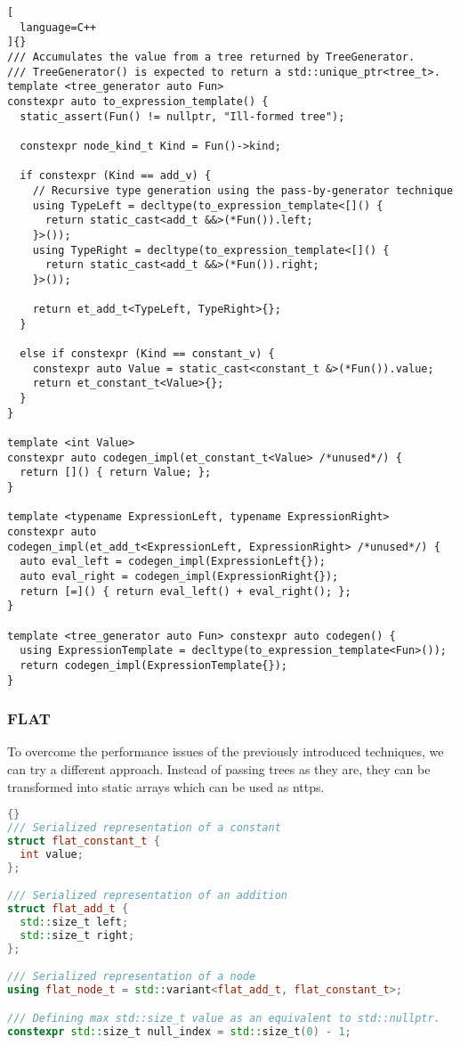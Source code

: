 \documentclass[../main]{subfiles}
\begin{document}
\begin{lstlisting}[
  language=C++
]{}
/// Accumulates the value from a tree returned by TreeGenerator.
/// TreeGenerator() is expected to return a std::unique_ptr<tree_t>.
template <tree_generator auto Fun>
constexpr auto to_expression_template() {
  static_assert(Fun() != nullptr, "Ill-formed tree");

  constexpr node_kind_t Kind = Fun()->kind;

  if constexpr (Kind == add_v) {
    // Recursive type generation using the pass-by-generator technique
    using TypeLeft = decltype(to_expression_template<[]() {
      return static_cast<add_t &&>(*Fun()).left;
    }>());
    using TypeRight = decltype(to_expression_template<[]() {
      return static_cast<add_t &&>(*Fun()).right;
    }>());

    return et_add_t<TypeLeft, TypeRight>{};
  }

  else if constexpr (Kind == constant_v) {
    constexpr auto Value = static_cast<constant_t &>(*Fun()).value;
    return et_constant_t<Value>{};
  }
}

template <int Value>
constexpr auto codegen_impl(et_constant_t<Value> /*unused*/) {
  return []() { return Value; };
}

template <typename ExpressionLeft, typename ExpressionRight>
constexpr auto
codegen_impl(et_add_t<ExpressionLeft, ExpressionRight> /*unused*/) {
  auto eval_left = codegen_impl(ExpressionLeft{});
  auto eval_right = codegen_impl(ExpressionRight{});
  return [=]() { return eval_left() + eval_right(); };
}

template <tree_generator auto Fun> constexpr auto codegen() {
  using ExpressionTemplate = decltype(to_expression_template<Fun>());
  return codegen_impl(ExpressionTemplate{});
}
\end{lstlisting}

\subsubsection{
  FLAT
}

\label{lbl:flat-technique}

To overcome the performance issues of the previously introduced techniques,
we can try a different approach. Instead of passing trees as they are,
they can be transformed into static arrays which can be used as \glspl{nttp}.

\begin{lstlisting}[language=C++, label=lst:flat_struct_def]{}
/// Serialized representation of a constant
struct flat_constant_t {
  int value;
};

/// Serialized representation of an addition
struct flat_add_t {
  std::size_t left;
  std::size_t right;
};

/// Serialized representation of a node
using flat_node_t = std::variant<flat_add_t, flat_constant_t>;

/// Defining max std::size_t value as an equivalent to std::nullptr.
constexpr std::size_t null_index = std::size_t(0) - 1;
\end{lstlisting}
\end{document}
